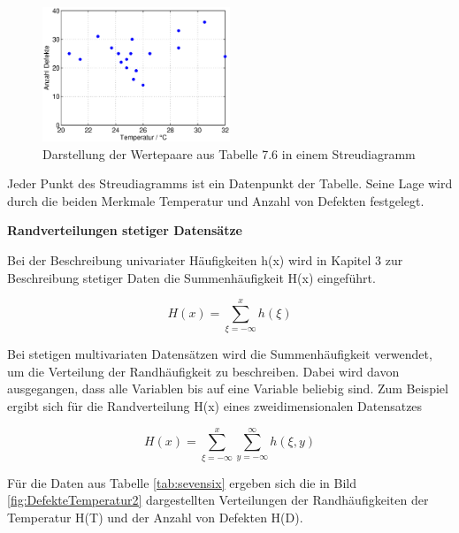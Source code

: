 \noindent 
\begin{figure}[H]
  \centerline{\includegraphics[width=0.5\textwidth]{Kapitel7/Bilder/image3}}
  \caption{Darstellung der Wertepaare aus Tabelle 7.6 in einem Streudiagramm}
  \label{fig:DefekteTemperatur1}
\end{figure}

\noindent Jeder Punkt des Streudiagramms ist ein Datenpunkt der Tabelle. Seine Lage wird durch die beiden Merkmale Temperatur und Anzahl von Defekten festgelegt.

\clearpage

{\selectfont
\noindent\textbf{Randverteilungen stetiger Datens\"{a}tze}}\smallskip

\noindent Bei der Beschreibung univariater H\"{a}ufigkeiten h(x) wird in Kapitel 3 zur Beschreibung stetiger Daten die Summenh\"{a}ufigkeit H(x) eingef\"{u}hrt. 

\begin{equation}\label{eq:sevennine}
H(x)=\sum _{\xi =-\infty}^{x}h(\xi)
\end{equation}

\noindent Bei stetigen multivariaten Datens\"{a}tzen wird die Summenh\"{a}ufigkeit verwendet, um die Verteilung der Randh\"{a}ufigkeit zu beschreiben. Dabei wird davon ausgegangen, dass alle Variablen bis auf eine Variable beliebig sind. Zum Beispiel ergibt sich f\"{u}r die Randverteilung H(x) eines zweidimensionalen Datensatzes 

\begin{equation}\label{eq:seventen}
H(x)=\sum _{\xi =-\infty}^{x}\sum _{y=-\infty}^{\infty }h(\xi ,y)
\end{equation}

\noindent F\"{u}r die Daten aus Tabelle \ref{tab:sevensix} ergeben sich die in Bild \ref{fig:DefekteTemperatur2} dargestellten Verteilungen der Randh\"{a}ufigkeiten der Temperatur H(T) und der Anzahl von Defekten H(D).

